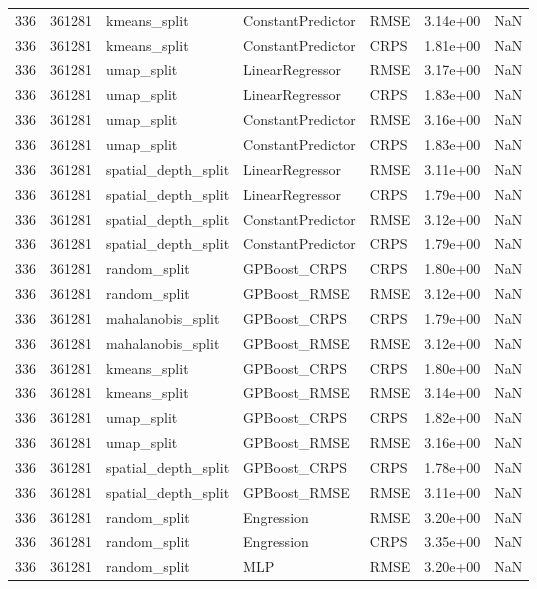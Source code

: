 \begin{tabular}{rrlllrr}
336 & 361281 & kmeans\_split & ConstantPredictor & RMSE & 3.14e+00 & NaN \\
336 & 361281 & kmeans\_split & ConstantPredictor & CRPS & 1.81e+00 & NaN \\
336 & 361281 & umap\_split & LinearRegressor & RMSE & 3.17e+00 & NaN \\
336 & 361281 & umap\_split & LinearRegressor & CRPS & 1.83e+00 & NaN \\
336 & 361281 & umap\_split & ConstantPredictor & RMSE & 3.16e+00 & NaN \\
336 & 361281 & umap\_split & ConstantPredictor & CRPS & 1.83e+00 & NaN \\
336 & 361281 & spatial\_depth\_split & LinearRegressor & RMSE & 3.11e+00 & NaN \\
336 & 361281 & spatial\_depth\_split & LinearRegressor & CRPS & 1.79e+00 & NaN \\
336 & 361281 & spatial\_depth\_split & ConstantPredictor & RMSE & 3.12e+00 & NaN \\
336 & 361281 & spatial\_depth\_split & ConstantPredictor & CRPS & 1.79e+00 & NaN \\
336 & 361281 & random\_split & GPBoost\_CRPS & CRPS & 1.80e+00 & NaN \\
336 & 361281 & random\_split & GPBoost\_RMSE & RMSE & 3.12e+00 & NaN \\
336 & 361281 & mahalanobis\_split & GPBoost\_CRPS & CRPS & 1.79e+00 & NaN \\
336 & 361281 & mahalanobis\_split & GPBoost\_RMSE & RMSE & 3.12e+00 & NaN \\
336 & 361281 & kmeans\_split & GPBoost\_CRPS & CRPS & 1.80e+00 & NaN \\
336 & 361281 & kmeans\_split & GPBoost\_RMSE & RMSE & 3.14e+00 & NaN \\
336 & 361281 & umap\_split & GPBoost\_CRPS & CRPS & 1.82e+00 & NaN \\
336 & 361281 & umap\_split & GPBoost\_RMSE & RMSE & 3.16e+00 & NaN \\
336 & 361281 & spatial\_depth\_split & GPBoost\_CRPS & CRPS & 1.78e+00 & NaN \\
336 & 361281 & spatial\_depth\_split & GPBoost\_RMSE & RMSE & 3.11e+00 & NaN \\
336 & 361281 & random\_split & Engression & RMSE & 3.20e+00 & NaN \\
336 & 361281 & random\_split & Engression & CRPS & 3.35e+00 & NaN \\
336 & 361281 & random\_split & MLP & RMSE & 3.20e+00 & NaN \\

\end{tabular}
